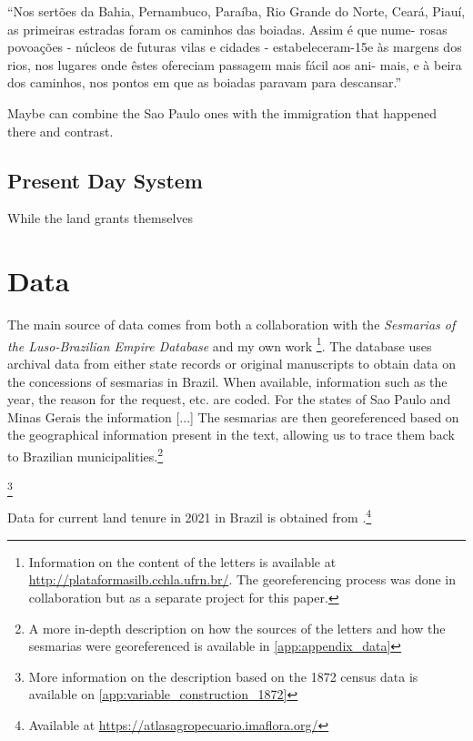 \documentclass{article}
\begin{document}
``Nos  sertões  da  Bahia,  Pernambuco,  Paraíba,  Rio  Grande  do  Norte,  Ceará,  Piauí, as primeiras estradas foram os  caminhos das boiadas.  Assim  é  que nume- rosas  povoações  - núcleos  de  futuras  vilas  e  cidades  - estabeleceram-15e  às  margens dos rios,  nos lugares onde  êstes ofereciam passagem mais fácil  aos ani- mais,  e  à  beira  dos  caminhos,  nos  pontos  em  que  as  boiadas  paravam  para  descansar.''
\parencite[p.~164]{De_Geografia1970-nk}

\parencite{Panini1990-rj}

Maybe can combine the Sao Paulo ones with the immigration that happened there and contrast.

\subsection{Present Day System}

While the land grants themselves 

\section{Data}

The main source of data comes from both a collaboration with the \textit{Sesmarias of the Luso-Brazilian Empire Database} and my own work \footnote{
  Information on the content of the letters is available at \url{http://plataformasilb.cchla.ufrn.br/}. The georeferencing process was done in collaboration but as a separate project for this paper.}.
The database uses archival data from either state records or original manuscripts to obtain data on the concessions of sesmarias in Brazil. 
When available, information such as the year, the reason for the request, etc. are coded. 
For the states of Sao Paulo and Minas Gerais the information [...]
The sesmarias are then georeferenced based on the geographical information present in the text, allowing us to trace them back to Brazilian municipalities.\footnote{A more in-depth description on how the sources of the letters and how the sesmarias were georeferenced is available in \autoref{app:appendix_data}}

\footnote{More information on the description based on the 1872 census data is available on \autoref{app:variable_construction_1872}}

Data for current land tenure in 2021 in Brazil is obtained from \textcite{Sparovek2019-dn}.\footnote{
  Available at \url{https://atlasagropecuario.imaflora.org/}}
\end{document}
